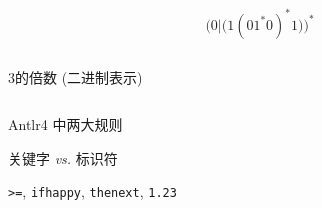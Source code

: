 \begin{frame}{}
  \[
    \Big(0|\big(1(01^{\ast}0)^{\ast}1\big)\Big)^{\ast}
  \]

  \begin{center}
  \end{center}
\end{frame}

\begin{frame}{}
  \begin{columns}
      \pause
      \begin{center}
        3的倍数 (二进制表示)
      \end{center}
  \end{columns}
\end{frame}

\begin{frame}{}
\end{frame}

\begin{frame}{}
  \begin{center}
    Antlr4 中两大规则

    \vspace{1.20cm}
     关键字 \emph{vs.} 标识符

    \vspace{0.60cm}
     \texttt{>=}, \texttt{ifhappy}, \texttt{thenext}, \texttt{1.23}
  \end{center}
\end{frame}
